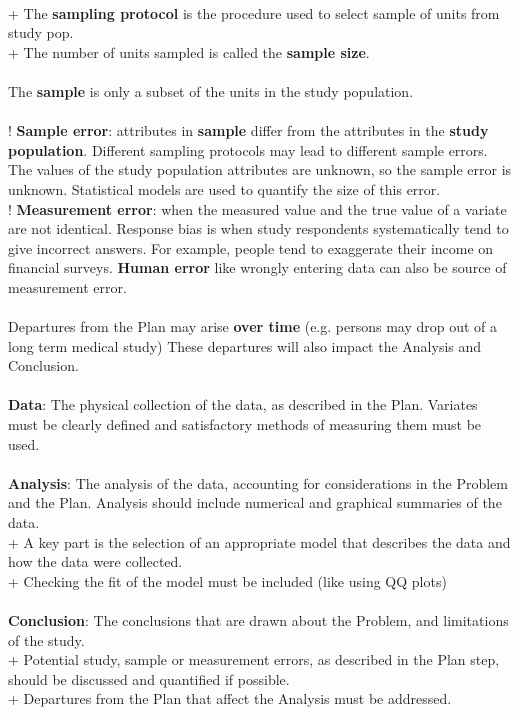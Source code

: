 \documentclass[a4paper,12pt]{article}
\begin{document}
\\ + The \textbf{sampling protocol} is the procedure used to select sample of units from study pop.
\\+ The number of units sampled is called the \textbf{sample size}.
\\
\\ The \textbf{sample} is only a subset of the units in the study population. 
\\
\\! \textbf{Sample error}: attributes in \textbf{sample} differ from the attributes in the \textbf{study population}. Different sampling protocols may lead to different sample errors. The values of the study population attributes are unknown, so the
sample error is unknown. Statistical models are used to quantify the size of this error. 
\\! \textbf{Measurement error}: when the measured value and the true value of a variate are not identical. Response bias is when study respondents systematically tend to give incorrect answers. For example, people tend to exaggerate their income on financial surveys. \textbf{Human error} like wrongly entering data can also be source of measurement error.
\\
\\ Departures from the Plan may arise \textbf{over time} (e.g. persons may drop out of a long term medical study) These departures will also impact the Analysis and Conclusion.
\\
\\\textbf{Data}: The physical collection of the data, as described in the Plan. Variates must be clearly defined and
satisfactory methods of measuring them must be used.
\\
\\\textbf{Analysis}: The analysis of the data, accounting for
considerations in the Problem and the Plan. Analysis should include numerical and graphical
summaries of the data.
\\+ A key part is the selection of an appropriate model
that describes the data and how the data were collected.
\\ + Checking the fit of the model must be included (like using QQ plots)
\\
\\\textbf{Conclusion}: The conclusions that are drawn about the Problem,
and limitations of the study.
\\+ Potential study, sample or measurement errors, as described in the Plan step, should be discussed and quantified if possible.
\\ + Departures from the Plan that affect the Analysis must be
addressed.
\\
\end{document}
